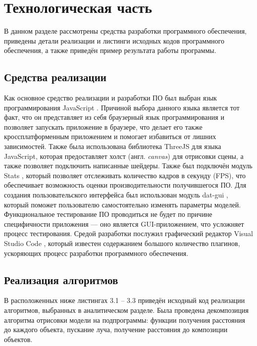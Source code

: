 \section{Технологическая часть}

В  данном  разделе  рассмотрены  средства  разработки  программного 
обеспечения, приведены детали реализации и листинги исходных кодов 
программного обеспечения, а также приведён пример результата работы программы.

\subsection{Средства реализации}
Как  основное  средство  реализации  и  разработки  ПО  был  выбран  язык 
программирования  JavaScript \cite{js}.
Причиной  выбора  данного  языка  является  тот факт,  что  он  представляет из себя браузерный язык  программирования  и  позволяет запускать приложение в браузере, что делает его также кроссплатформенным приложением  и  помогает  избавиться  от  лишних  зависимостей. 
Также  была использована библиотека ThreeJS \cite{threejs} для языка JavaScript, которая предоставляет холст  (англ.  \textit{canvas})  для  отрисовки  сцены,  а  также  позволяет  подключить написанные шейдеры.
Также был подключён модуль Stats \cite{stats}, который позволяет 
отслеживать  количество  кадров  в  секунду  (FPS),  что  обеспечивает возможность оценки 
производительности  получившегося  ПО.
Для  создания  пользовательского интерфейса  был  использован  модуль  dat-gui \cite{datgui},  который  поможет  пользователю 
самостоятельно  изменять  параметры  моделей.
Функциональное  тестирование ПО  проводиться  не  будет  по  причине  специфичности  приложения  --- оно является  GUI-приложением,  что  усложняет  процесс  тестирования.
Средой разработки  послужил  графический  редактор  Visual  Studio  Code \cite{vscode},  который 
известен  содержанием  большого  количество  плагинов,  ускоряющих  процесс 
разработки  программного  обеспечения.


\subsection{Реализация алгоритмов}

В  расположенных  ниже  листингах  3.1  --  3.3  приведён  исходный  код 
реализации алгоритмов, выбранных в аналитическом разделе.
Была проведена декомпозиция  алгоритма  отрисовки  модели  на  подпрограммы:  функции 
получения расстояния до каждого объекта, пускание луча, получение расстояния 
до композиции объектов.

